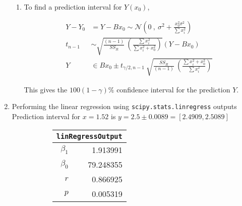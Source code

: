 \begin{enumerate}
\begin{enumerate}
	\item To find a prediction interval for $ Y(x_0) $,
	
	\begin{align}
		Y - Y_0 &= Y - B x_0 \sim \mathcal{N}\left(0\ ,\  \sigma^2 + \frac{x_0^2 \sigma^2}{\sum x_i^2}\right) 
\nonumber\\
		t_{n-1} &\sim \sqrt{\frac{(n-1)}{SS_R}\ \left(\frac{\sum x_i^2}{\sum x_i^2 + x_0^2}\right)} (Y - B x_0)  \nonumber \\
		Y &\in B x_0 \pm t_{\gamma/2, n-1}\ \sqrt{\frac{SS_R}{(n-1)}\ \left(\frac{\sum x_i^2 + x_0^2}{\sum x_i^2}\right)} 
	\end{align}

	This gives the $ 100 (1 - \gamma)\% $ confidence interval for the prediction $ Y $.

\end{enumerate}

\item Performing the linear regression using \texttt{scipy.stats.linregress} outputs \\
Prediction interval for $ x = 1.52 $ is $ y = 2.5 \pm 0.0089 = [2.4909, 2.5089] $\\


\begin{figure}[H]
	\begin{subfigure}[]{0.2\linewidth}
		\centering
		\begin{tabular}{@{}rr@{}}
			\toprule
			\multicolumn{2}{c}{\texttt{linRegressOutput}} \\
			\midrule
			$\beta_1$     &         1.913991 \\
			$\beta_0$ &        79.248355 \\
			$r$    &         0.866925 \\
			$p$    &         0.005319 \\
			\bottomrule
		\end{tabular}
		
	\end{subfigure}
	\begin{subfigure}[]{0.8\linewidth}
		\centering
		
	\end{subfigure}
\end{figure}


\end{enumerate}
